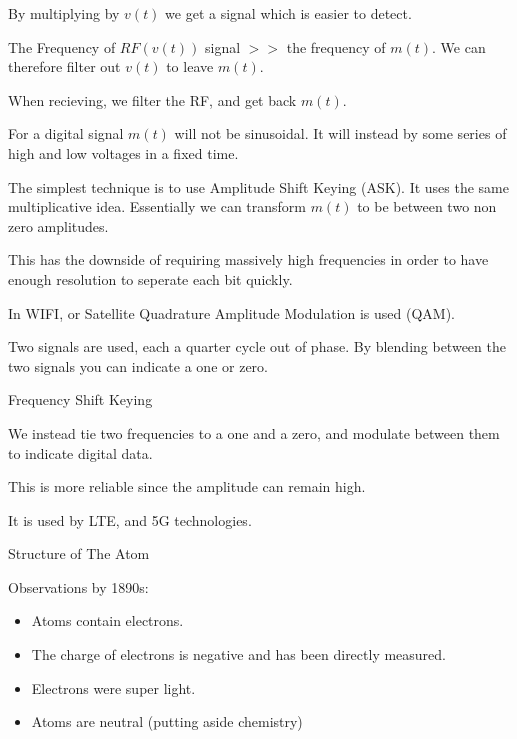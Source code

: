 \documentclass{report}
\begin{document}
\begin{description}
\begin{mdframed}
            By multiplying by $v(t)$ we get a signal which
            is easier to detect.


            The Frequency of $RF(v(t))$ signal  $>>$ the frequency
            of  $m(t)$. We can therefore filter out  $v(t)$ to
            leave  $m(t)$.

            When recieving, we filter the RF, and get back
             $m(t)$.
        \end{mdframed}
        \begin{mdframed}
            For a digital signal $m(t)$ will not be
            sinusoidal. It will instead by some series
            of high and low voltages in a fixed time.

            The simplest technique is to use Amplitude
            Shift Keying (ASK). It uses the same
            multiplicative idea. Essentially
            we can transform $m(t)$ to be between
            two non zero amplitudes.

            This has the downside of requiring massively
            high frequencies in order to have enough resolution
            to seperate each bit quickly.

            In WIFI, or Satellite Quadrature Amplitude
            Modulation is used (QAM).

            Two signals are used, each a quarter cycle
            out of phase. By blending between the two
            signals you can indicate a one or zero.
        \end{mdframed}
    \item {\large Frequency Shift Keying}
        \begin{mdframed}
            We instead tie two frequencies to a one
            and a zero, and modulate between them to indicate
            digital data.

            This is more reliable since the amplitude can remain
            high.

            It is used by LTE, and 5G technologies.
        \end{mdframed}
        \pagebreak
    \item {\large Structure of The Atom}
        \begin{mdframed}
            Observations by 1890s:
            \begin{itemize}
                \item Atoms contain electrons.
                \item The charge of electrons is negative and has been directly measured.
                \item Electrons were super light.
                \item Atoms are neutral (putting aside chemistry)
            \end{itemize}


\end{mdframed}
\end{description}
\end{document}
